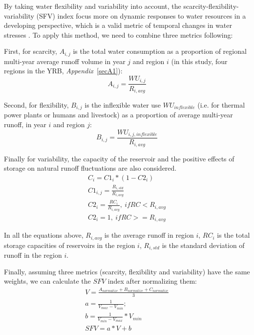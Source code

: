 By taking water flexibility and variability into account, the scarcity-flexibility-variability (SFV) index focus more on dynamic responses to water resources in a developing perspective, which is a valid metric of temporal changes in water stresses \cite{qin2019}. To apply this method, we need to combine three metrics following:

First, for scarcity, $A_{i, j}$ is the total water consumption as a proportion of regional multi-year average runoff volume in year $j$ and region $i$ (in this study, four regions in the YRB, \textit{Appendix}~\ref{secA1}):
\begin{equation}
    A_{i, j} = \frac{WU_{i,j}}{R_{i, avg}}
\end{equation}

Second, for flexibility, $B_{i, j}$ is the inflexible water use $WU_{inflexible}$ (i.e. for thermal power plants or humans and livestock) as a proportion of average multi-year runoff, in year $i$ and region $j$:
\begin{equation}
    B_{i, j} = \frac{WU_{i, j, inflexible}}{R_{i, avg}}
\end{equation}

Finally for variability, the capacity of the reservoir and the positive effects of storage on natural runoff fluctuations are also considered.
\begin{gather}
C_i = C1_i * (1 - C2_i) \\
C1_{i, j} = \frac{R_{i, std}}{R_{i, avg}} \\
C2_{i} = \frac{RC_{i}}{R_{i, avg}}, \ if RC < R_{i, avg} \\
C2_{i} = 1, \ if RC >= R_{i, avg}
\end{gather}

In all the equations above, $R_{i, avg}$ is the average runoff in region $i$, $RC_i$ is the total storage capacities of reservoirs in the region $i$, $R_{i, std}$ is the standard deviation of runoff in the region $i$.

Finally, assuming three metrics (scarcity, flexibility and variability) have the same weights, we can calculate the $SFV$ index after normalizing them:
\begin{gather}
    V = \frac{A_{normalize} + B_{normalize} + C_{normalize}}{3}\\
    a = \frac{1}{V_{max} - V_{min}};\\
    b = \frac{1}{V_{min} - V_{max}} * V_{min}\\
    SFV = a * V + b
\end{gather}
